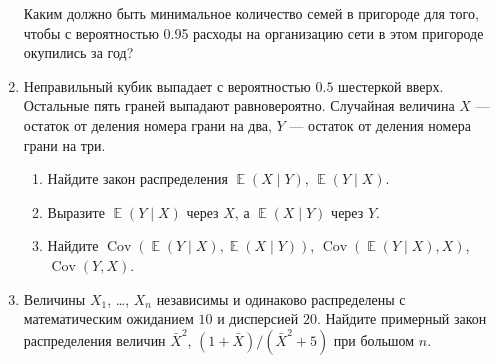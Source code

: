 \documentclass[12pt]{article} %
\DeclareMathOperator{\Cov}{Cov}
\DeclareMathOperator{\E}{\mathbb{E}}
\begin{document}
\begin{enumerate}
  Каким должно быть минимальное количество семей в пригороде для того, чтобы с вероятностью 0.95
  расходы на организацию сети в этом пригороде окупились за год?
  
  
  \item  Неправильный кубик выпадает с вероятностью $0.5$ шестеркой вверх. 
  Остальные пять граней выпадают равновероятно. 
  Случайная величина $X$ — остаток от деления номера грани на два, 
  $Y$ — остаток от деления номера грани на три. 
 \begin{enumerate}
 \item Найдите закон распределения $\E(X\mid Y)$, $\E(Y\mid X)$.
 \item Выразите $\E(Y\mid X)$ через $X$, а $\E(X\mid Y)$ через $Y$.
 \item Найдите $\Cov(\E(Y\mid X),\E(X\mid Y))$, $\Cov(\E(Y\mid X),X)$, $\Cov(Y,X)$.
 \end{enumerate}
 
    
  \item  Величины $X_1$, \ldots, $X_n$ независимы и одинаково распределены с математическим ожиданием $10$ и дисперсией $20$. 
  Найдите примерный закон распределения величин $\bar X^2$, $(1+\bar{X})/(\bar{X}^2+5)$ при большом $n$.
 
 

\end{enumerate}
\end{document}
